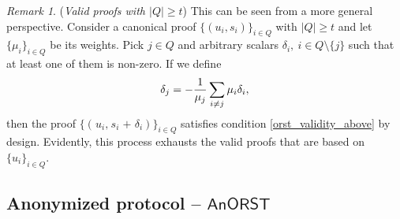 \documentclass[psamsfonts, reqno]{amsart}
\theoremstyle{definition}
\theoremstyle{remark}
\newtheorem{rem}[thm]{Remark}
\numberwithin{equation}{section}
\begin{document}
\begin{rem}\label{orst_valid_above_rem}
(\textit{Valid proofs with $|Q| \ge t$})
This can be seen from a more general perspective.
Consider a canonical proof $\{(u_i, s_i)\}_{i \in Q}$
with $|Q| \ge t$ and let $\{\mu_i\}_{i \in Q}$ be its weights.
Pick $j \in Q$ and arbitrary scalars
$\delta_i,\ i \in Q \setminus \{j\}$
such that at least one of them is non-zero.
If we define
\vspace{5pt}
\begin{equation*}
\delta_j = - \frac{1}{\mu_j}
\sum_{i \neq j} \mu_i \delta_i,
\vspace{5pt}
\end{equation*}
then the proof $
	\{
		(
			\hspace{1pt}
			u_i,
			\hspace{1pt}
			s_i
			\hspace{1pt}
			+
			\hspace{1pt}
			\delta_i
		)
	\}_{i \in Q}$
satisfies condition \eqref{orst_validity_above}
by design. Evidently, this process exhausts the valid proofs
that are based on $\{u_i\}_{i \in Q}$.
\end{rem}

\subsection{Anonymized protocol -- $\mathsf{AnORST}$}
\end{document}
